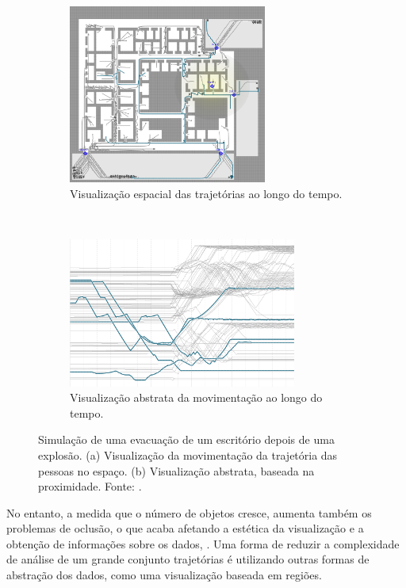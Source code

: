 \begin{description}
\begin{figure}[ht!]
  \centering
  \begin{subfigure}[t]{0.45\textwidth}
    \centering
    \includegraphics[width=65mm]{../figuras/proximidade-espacial.png}
    \caption{Visualização espacial das trajetórias ao longo do tempo. \label{fig:viz-espacial}}
  \end{subfigure}
  ~
  \begin{subfigure}[t]{0.45\textwidth}
    \centering
    \includegraphics[width=75mm]{../figuras/proximidade-abstrata.png}
    \caption{Visualização abstrata da movimentação ao longo do tempo. \label{fig:viz-abstrata}}
  \end{subfigure}

  \caption[Visualização cartesiana vs abstrata da movimentação de pessoas em um
escritório]{Simulação de uma evacuação de um escritório depois de uma explosão.
(a) Visualização da movimentação da trajetória das pessoas no espaço. (b)
Visualização abstrata, baseada na proximidade.  Fonte: \citet{Tarik2009}.
\label{fig:tarik}}
\end{figure}

  No entanto, a medida que o número de objetos cresce, aumenta também os
problemas de oclusão, o que acaba afetando a estética da visualização e a
obtenção de informações sobre os dados, \citep{Zhou2013}. Uma forma de reduzir
a complexidade de análise de um grande conjunto  trajetórias é utilizando
outras formas de abstração dos dados, como uma visualização baseada em regiões.


\end{description}
